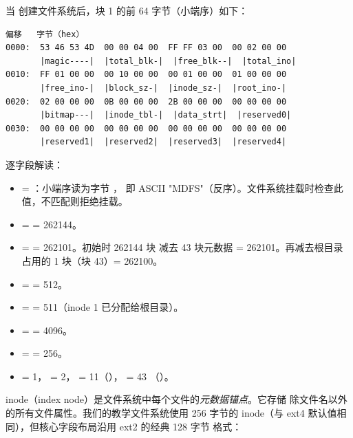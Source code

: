 \begin{filesystemlayout}
当  创建文件系统后，块 1 的前 64 字节（小端序）如下：

\begin{lstlisting}
偏移   字节（hex）
0000:  53 46 53 4D  00 00 04 00  FF FF 03 00  00 02 00 00
       |magic----|  |total_blk-|  |free_blk--|  |total_ino|
0010:  FF 01 00 00  00 10 00 00  00 01 00 00  01 00 00 00
       |free_ino-|  |block_sz-|  |inode_sz-|  |root_ino-|
0020:  02 00 00 00  0B 00 00 00  2B 00 00 00  00 00 00 00
       |bitmap---|  |inode_tbl-|  |data_strt|  |reserved0|
0030:  00 00 00 00  00 00 00 00  00 00 00 00  00 00 00 00
       |reserved1|  |reserved2|  |reserved3|  |reserved4|
\end{lstlisting}

逐字段解读：

\begin{itemize}\tightlist
\item {} = ：小端序读为字节 ，
  即 ASCII "MDFS"（反序）。文件系统挂载时检查此值，不匹配则拒绝挂载。
\item {} =  = 262144。
\item {} =  = 262101。初始时 262144 块
  减去 43 块元数据 = 262101。再减去根目录占用的 1 块（块 43）= 262100。
\item {} =  = 512。
\item {} =  = 511（inode 1 已分配给根目录）。
\item {} =  = 4096。
\item {} =  = 256。
\item {} = 1， = 2，
   = 11（）， = 43
  （）。
\end{itemize}


inode（index node）是文件系统中每个文件的\emph{元数据锚点}。它存储
除文件名以外的所有文件属性。我们的教学文件系统使用 256 字节的
inode（与 ext4 默认值相同），但核心字段布局沿用 ext2 的经典 128 字节
格式：


\end{filesystemlayout}

